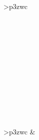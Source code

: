 \documentclass[uplatex, dvipdfmx, paper=a4paper, line_length=45zw, head_space=7zw, foot_space=10zw]{jlreq}
\begin{document}
\begin{center}
\begin{booktabular}{>{\ttfamily\small}p{3zw}c}
      \\
      \\
      \\
        \\
        \\
        \\
        \\
        \\
      \\
        \\
        \\
        \\
  \end{booktabular}\hfil
  \colorbox{\tabularColor}{%
  \begin{booktabular}{>{\ttfamily\small}p{3zw}c}
     &  \\
    \midrule
        \\
        \\
        \\
      \\
        \\
        \\
        \\
        \\
        \\
        \\
        \\
        \\
        \\
        \\
        \\
        \\
        \\
        \\
        \\
        \\
        \\
        \\
        \\

\end{booktabular}}
\end{center}
\end{document}
